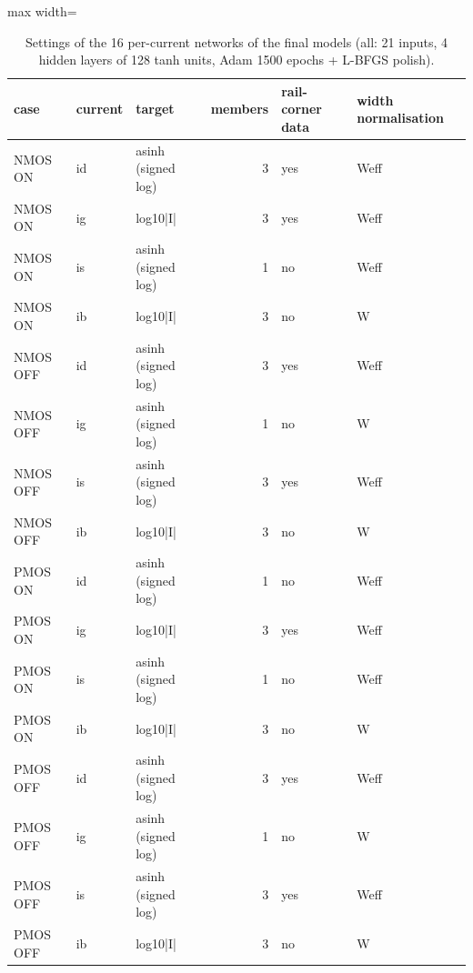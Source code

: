 \begin{table}[H]
\centering
{\small
\begin{adjustbox}{max width=\linewidth}
\begin{tabular}{lllrll}
\toprule
case & current & target & members & rail-corner data & width normalisation \\
\midrule
NMOS ON & id & asinh (signed log) & 3 & yes & Weff \\
NMOS ON & ig & log10|I| & 3 & yes & Weff \\
NMOS ON & is & asinh (signed log) & 1 & no & Weff \\
NMOS ON & ib & log10|I| & 3 & no & W \\
NMOS OFF & id & asinh (signed log) & 3 & yes & Weff \\
NMOS OFF & ig & asinh (signed log) & 1 & no & W \\
NMOS OFF & is & asinh (signed log) & 3 & yes & Weff \\
NMOS OFF & ib & log10|I| & 3 & no & W \\
PMOS ON & id & asinh (signed log) & 1 & no & Weff \\
PMOS ON & ig & log10|I| & 3 & yes & Weff \\
PMOS ON & is & asinh (signed log) & 1 & no & Weff \\
PMOS ON & ib & log10|I| & 3 & no & W \\
PMOS OFF & id & asinh (signed log) & 3 & yes & Weff \\
PMOS OFF & ig & asinh (signed log) & 1 & no & W \\
PMOS OFF & is & asinh (signed log) & 3 & yes & Weff \\
PMOS OFF & ib & log10|I| & 3 & no & W \\
\bottomrule
\end{tabular}
\end{adjustbox}
}
\caption{Settings of the 16 per-current networks of the final models (all: 21 inputs, 4 hidden layers of 128 tanh units, Adam 1500 epochs + L-BFGS polish).}
\label{tab:settings}
\end{table}

